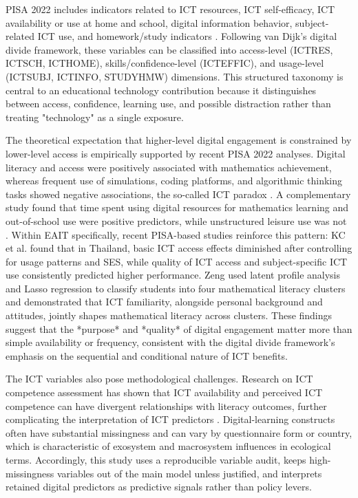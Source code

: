 \documentclass[pdflatex,sn-mathphys-ay]{sn-jnl}
\begin{document}
PISA 2022 includes indicators related to ICT resources, ICT self-efficacy, ICT availability or use at home and school, digital information behavior, subject-related ICT use, and homework/study indicators \citep{OECD_2022_results_vol2}. Following van Dijk's digital divide framework, these variables can be classified into access-level (ICTRES, ICTSCH, ICTHOME), skills/confidence-level (ICTEFFIC), and usage-level (ICTSUBJ, ICTINFO, STUDYHMW) dimensions. This structured taxonomy is central to an educational technology contribution because it distinguishes between access, confidence, learning use, and possible distraction rather than treating "technology" as a single exposure.

The theoretical expectation that higher-level digital engagement is constrained by lower-level access \citep{van_Dijk_2020} is empirically supported by recent PISA 2022 analyses. Digital literacy and access were positively associated with mathematics achievement, whereas frequent use of simulations, coding platforms, and algorithmic thinking tasks showed negative associations, the so-called ICT paradox \citep{Joshi_2025_digital_literacy}. A complementary study found that time spent using digital resources for mathematics learning and out-of-school use were positive predictors, while unstructured leisure use was not \citep{Joshi_2025_digital_resources}. Within EAIT specifically, recent PISA-based studies reinforce this pattern: KC et al. \citep{KC_2025_digital_inequality} found that in Thailand, basic ICT access effects diminished after controlling for usage patterns and SES, while quality of ICT access and subject-specific ICT use consistently predicted higher performance. Zeng \citep{Zeng_2024} used latent profile analysis and Lasso regression to classify students into four mathematical literacy clusters and demonstrated that ICT familiarity, alongside personal background and attitudes, jointly shapes mathematical literacy across clusters. These findings suggest that the *purpose* and *quality* of digital engagement matter more than simple availability or frequency, consistent with the digital divide framework's emphasis on the sequential and conditional nature of ICT benefits.

The ICT variables also pose methodological challenges. Research on ICT competence assessment has shown that ICT availability and perceived ICT competence can have divergent relationships with literacy outcomes, further complicating the interpretation of ICT predictors \citep{Acun_Celik_2024}. Digital-learning constructs often have substantial missingness and can vary by questionnaire form or country, which is characteristic of exosystem and macrosystem influences in ecological terms. Accordingly, this study uses a reproducible variable audit, keeps high-missingness variables out of the main model unless justified, and interprets retained digital predictors as predictive signals rather than policy levers.
\end{document}
